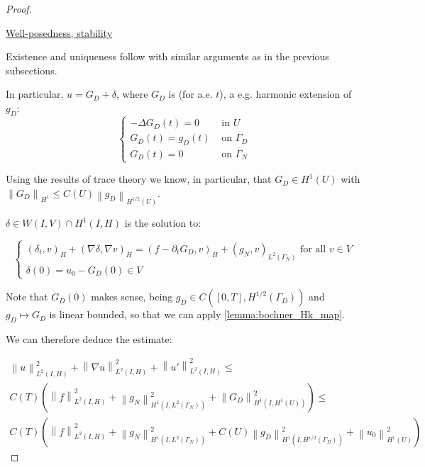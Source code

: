 \documentclass[english,a4paper,10pt,oneside]{scrbook}	%
\theoremstyle{break}
\newenvironment{mproof}[1][\proofname]{%
  \begin{proof}[#1]$ $\par\nobreak\ignorespaces
}{%
  \end{proof}
}
\renewcommand*{\proofname}{Proof}
\theoremstyle{remark}
\newcommand{\norm}[1]{\left\lVert#1\right\rVert}
\begin{document}
\begin{mproof}

\underline{Well-posedness, stability}

Existence and uniqueness follow with similar arguments as in the previous subsections.

In particular, $u=G_D + \delta$, where $G_D$ is (for a.e. $t$), a e.g. harmonic extension of $g_D$:
$$
\left\{\begin{matrix}
-\Delta G_D(t) = 0 & \text{ in } U\\ 
G_D(t) = g_D(t) & \text{ on } \Gamma_D\\ 
G_D(t) = 0 & \text{ on } \Gamma_N 
\end{matrix}\right.
$$

Using the results of trace theory we know, in particular, that $G_D \in H^1(U)$ with $\norm{G_D}_{H^1}\leq C(U) \norm{g_D}_{H^{1/2}(U)}$.

$\delta \in W(I,V) \cap H^1(I,H)$ is the solution to:

$$
\left\{\begin{matrix}
(\delta_t,v)_H + (\nabla \delta, \nabla v)_H = (f - \partial_t G_D,v)_H + (g_N,v)_{L^2(\Gamma_N)} \text{ for all } v \in V\\ 
\delta(0) = u_0 - G_D(0) \in V
\end{matrix}\right.
$$

Note that $G_D(0)$ makes sense, being $g_D \in C([0,T], H^{1/2}(\Gamma_D))$ and $g_D \mapsto G_D$ is linear bounded, so that we can apply \cref{lemma:bochner_Hk_map}.

We can therefore deduce the estimate:

\begin{align*}
	\norm{u}^2_{L^2(I,H)}+\norm{\nabla u}^2_{L^2(I,H)} + \norm{u'}^2_{L^2(I,H)} \leq \\
	C(T)\left (  \norm{f}_{L^2(I,H)}^2 +  \norm{g_N}^2_{H^1(I,L^2(\Gamma_N))}  + \norm{G_D}^2_{H^1(I,H^1(U))}\right )  \leq \\
	C(T)\left (  \norm{f}_{L^2(I,H)}^2 +  \norm{g_N}^2_{H^1(I,L^2(\Gamma_N))} + C(U) \norm{g_D}^2_{H^1(I,H^{1/2}(\Gamma_D))} + \norm{u_0}^2_{H^1(U)}\right )
\end{align*}


\end{mproof}
\end{document}
